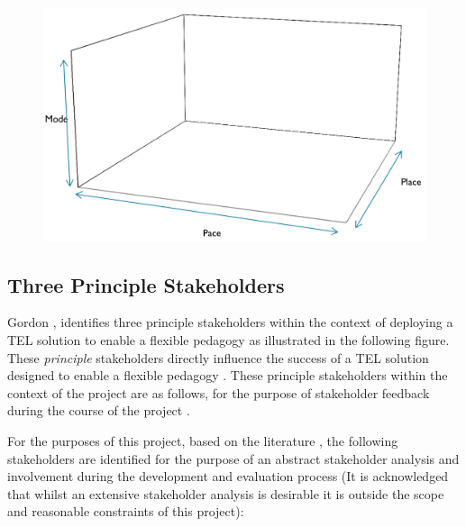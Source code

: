 \begin{figure}[H]
	\centering
	\includegraphics[scale=0.4]{figures/flexibleDesign}
	\label{fig:Flexible Pedagogy Design Considerations for TEL}
\end{figure}

\label{sec:sec01}
\subsection{Three Principle Stakeholders}
\label{subsec:subsec01}

Gordon \cite{Gordon2014}, identifies three principle stakeholders within the context of deploying  a TEL solution to enable a flexible pedagogy as illustrated in the following figure. These \textit{principle} stakeholders directly influence the success of a TEL solution designed to enable a flexible pedagogy \cite{Gordon2014}. These principle stakeholders within the context of the project are as follows, for the purpose of stakeholder feedback during the course of the project .

For the purposes of this project, based on the literature \cite{Gordon2014}, the following stakeholders are identified for the purpose of an abstract stakeholder analysis and involvement during the development and evaluation process (It is acknowledged that whilst an extensive stakeholder analysis is desirable it is outside the scope and reasonable constraints of this project):

